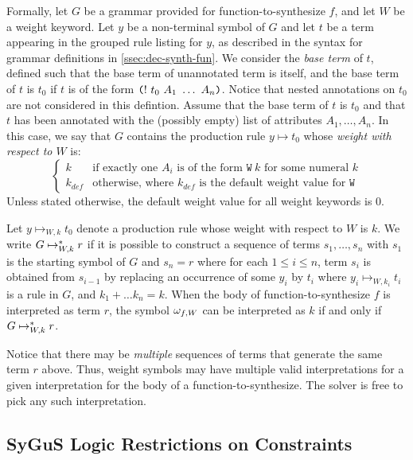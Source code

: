 \documentclass[english,a4paper,10pt]{article}
\begin{document}
Formally,
let $G$ be a grammar provided for function-to-synthesize $f$, and let $W$ be a weight keyword.
Let $y$ be a non-terminal symbol of $G$ and let $t$ be a term appearing
in the grouped rule listing for $y$, as described in the syntax for grammar
definitions in \cref{ssec:dec-synth-fun}.
We consider the \emph{base term} of $t$, defined such that
the base term of unannotated term is itself, and
the base term of $t$ is $t_0$ if $t$ is of the form 
$\texttt{(}!\mbox{ }t_0\mbox{ }A_1\mbox{ }\ldots\mbox{ }A_n\texttt{)}$.
Notice that nested annotations on $t_0$ are not considered in this defintion.
Assume that the base term of $t$ is $t_0$ and that
$t$ has been annotated with the (possibly empty) list of attributes $A_1, \ldots, A_n$.
In this case, we say that $G$ contains
the production rule $y \mapsto t_0$ whose \emph{weight with respect to $W$} is:
\[
\begin{cases}
k & \text{if exactly one } A_i \text{ is of the form } \texttt{W}\ k \text{ for some numeral } k \\
k_{def} & \text{otherwise, where } k_{def} \text{ is the default weight value for } \texttt{W}
\end{cases}
\]
Unless stated otherwise, the default weight value for all weight keywords is $0$.

Let $y \mapsto_{W,k} t_0$ denote a production rule
whose weight with respect to $W$ is $k$.
We write $G \mapsto_{W,k}^{\ast} r$ if it is possible to construct a sequence of terms
$s_1, \ldots, s_n$
with $s_1$ is the starting symbol of $G$ and $s_n = r$
where for each $1 \leq i \leq n$, term $s_i$ is obtained from $s_{i-1}$ by
replacing an occurrence of some $y_i$ by $t_i$
where $y_i \mapsto_{W,k_i} t_i$ is a rule in $G$,
and $k_1 + \ldots k_n = k$.
When the body of function-to-synthesize $f$ is interpreted as term $r$,
the symbol $\omega_{f,W}$ can be interpreted as $k$ if and only if
$G \mapsto_{W,k}^{\ast} r$.

Notice that there may be \emph{multiple} sequences of terms that
generate the same term $r$ above.
Thus, weight symbols may have multiple valid
interpretations for a given interpretation for the body of a function-to-synthesize.
The solver is free to pick any such interpretation.

\subsection{SyGuS Logic Restrictions on Constraints}
\label{ssec:logicr-constraints}

\end{document}
